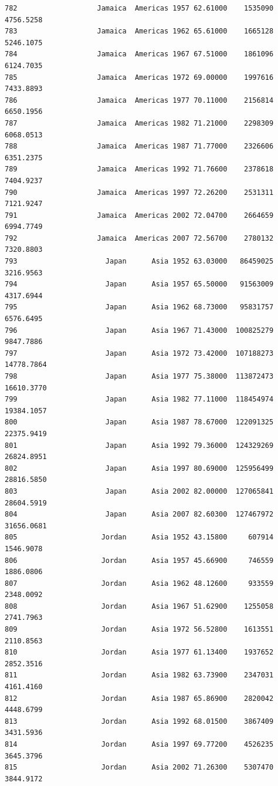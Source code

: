 \documentclass[
  letterpaper,
  DIV=11,
  numbers=noendperiod]{scrreprt}
\begin{document}
\begin{verbatim}
782                   Jamaica  Americas 1957 62.61000    1535090   4756.5258
783                   Jamaica  Americas 1962 65.61000    1665128   5246.1075
784                   Jamaica  Americas 1967 67.51000    1861096   6124.7035
785                   Jamaica  Americas 1972 69.00000    1997616   7433.8893
786                   Jamaica  Americas 1977 70.11000    2156814   6650.1956
787                   Jamaica  Americas 1982 71.21000    2298309   6068.0513
788                   Jamaica  Americas 1987 71.77000    2326606   6351.2375
789                   Jamaica  Americas 1992 71.76600    2378618   7404.9237
790                   Jamaica  Americas 1997 72.26200    2531311   7121.9247
791                   Jamaica  Americas 2002 72.04700    2664659   6994.7749
792                   Jamaica  Americas 2007 72.56700    2780132   7320.8803
793                     Japan      Asia 1952 63.03000   86459025   3216.9563
794                     Japan      Asia 1957 65.50000   91563009   4317.6944
795                     Japan      Asia 1962 68.73000   95831757   6576.6495
796                     Japan      Asia 1967 71.43000  100825279   9847.7886
797                     Japan      Asia 1972 73.42000  107188273  14778.7864
798                     Japan      Asia 1977 75.38000  113872473  16610.3770
799                     Japan      Asia 1982 77.11000  118454974  19384.1057
800                     Japan      Asia 1987 78.67000  122091325  22375.9419
801                     Japan      Asia 1992 79.36000  124329269  26824.8951
802                     Japan      Asia 1997 80.69000  125956499  28816.5850
803                     Japan      Asia 2002 82.00000  127065841  28604.5919
804                     Japan      Asia 2007 82.60300  127467972  31656.0681
805                    Jordan      Asia 1952 43.15800     607914   1546.9078
806                    Jordan      Asia 1957 45.66900     746559   1886.0806
807                    Jordan      Asia 1962 48.12600     933559   2348.0092
808                    Jordan      Asia 1967 51.62900    1255058   2741.7963
809                    Jordan      Asia 1972 56.52800    1613551   2110.8563
810                    Jordan      Asia 1977 61.13400    1937652   2852.3516
811                    Jordan      Asia 1982 63.73900    2347031   4161.4160
812                    Jordan      Asia 1987 65.86900    2820042   4448.6799
813                    Jordan      Asia 1992 68.01500    3867409   3431.5936
814                    Jordan      Asia 1997 69.77200    4526235   3645.3796
815                    Jordan      Asia 2002 71.26300    5307470   3844.9172

\end{verbatim}
\end{document}
